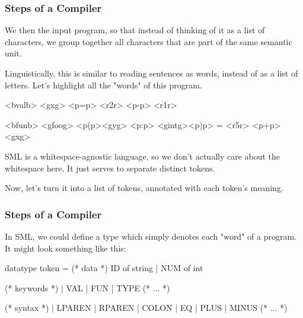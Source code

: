 \documentclass[aspectratio=169]{beamer}
\begin{document}
\begin{frame}[fragile]
  \frametitle{Steps of a Compiler}

  We then  the input program, so that instead of thinking of it
  as a list of characters, we group together all characters that are part of
  the same semantic unit.

  \vspace{\fill}

  Linguistically, this is similar to reading sentences as words, instead of as
  a list of letters. Let's highlight all the "words" of this program.

  \vspace{\fill}

  \begin{codeblock}
    <bvalb> <gxg> <p=p> <r2r> <p-p> <r1r>

    <bfunb> <gfoog> <p(p><gyg> <p:p> <gintg><p)p> = <r5r> <p+p> <gxg>
  \end{codeblock}

  \vspace{\fill}

  SML is a whitespace-agnostic language, so we don't actually care about
  the whitespace here. It just serves to separate distinct tokens.

  \vspace{\fill}

  Now, let's turn it into a list of tokens, annotated with each token's meaning.
\end{frame}

\begin{frame}[fragile]
  \frametitle{Steps of a Compiler}

  In SML, we could define a type  which simply denotes each
  "word" of a program. It might look something like this:

  \begin{codeblock}
    datatype token =
      (* data *)
        ID of string | NUM of int

      (* keywords *)
      | VAL | FUN | TYPE (* ... *)

      (* syntax *)
      | LPAREN | RPAREN | COLON | EQ | PLUS | MINUS
      (* ... *)
  \end{codeblock}
\end{frame}
\end{document}
